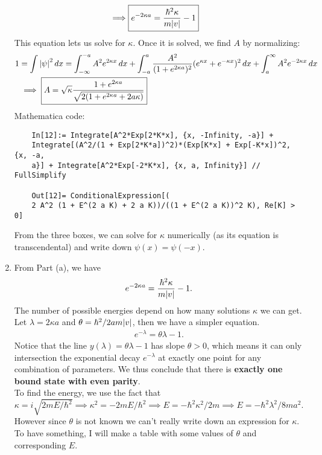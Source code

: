\documentclass{article}
\theoremstyle{definition}
\newcommand{\f}[2]{\frac{#1}{#2}}
\begin{document}
\begin{enumerate}[label=(\alph*)]
\begin{align*}
	\implies & \boxed{e^{-2\kappa a} = \f{\hbar^2\kappa}{m\abs{v}}-1}
	\end{align*}
	This equation lets us solve for $\kappa$. Once it is solved, we find $A$ by normalizing:
	\begin{align*}
	1 &= \int \abs{\psi}^2\,dx =  \int_{-\infty}^{-a} A^2 e^{2\kappa x} \,dx + \int_{-a}^{a} \f{A^2}{(1+e^{2\kappa a})^2} (e^{\kappa x} + e^{-\kappa x})^2 \,dx + \int_{a}^{\infty} A^2 e^{-2\kappa x} \,dx \\
	 &\implies  \boxed{{A} =  \sqrt{\kappa} \f{1+e^{2\kappa a}}{\sqrt{2(1 + e^{2\kappa a} + 2a\kappa)}}}
	\end{align*} 
	Mathematica code:
	\begin{lstlisting}
	In[12]:= Integrate[A^2*Exp[2*K*x], {x, -Infinity, -a}] + 
	Integrate[(A^2/(1 + Exp[2*K*a])^2)*(Exp[K*x] + Exp[-K*x])^2, {x, -a,
	a}] + Integrate[A^2*Exp[-2*K*x], {x, a, Infinity}] // FullSimplify
	
	Out[12]= ConditionalExpression[(
	2 A^2 (1 + E^(2 a K) + 2 a K))/((1 + E^(2 a K))^2 K), Re[K] > 0]
	\end{lstlisting}
	From the three boxes, we can solve for $\kappa$ numerically (as its equation is transcendental) and write down $\psi(x) = \psi(-x)$. 
	
	\item From Part (a), we have
	\begin{align*}
	e^{-2\kappa a} = \f{\hbar^2\kappa}{m\abs{v}}-1. 
	\end{align*}
	The number of possible energies depend on how many solutions $\kappa$ we can get. Let $\lambda = 2\kappa a$ and $\theta = \hbar^2 /2am\abs{v}$, then we have a simpler equation.
	\begin{align*}
	e^{-\lambda } = \theta \lambda - 1. 
	\end{align*}
	Notice that the line $y(\lambda) = \theta\lambda - 1$ has slope $\theta > 0$, which means it can only intersection the exponential decay $e^{-\lambda}$ at exactly one point for any combination of parameters. We thus conclude that there is \textbf{exactly one bound state with even parity}.\\
	
	To find the energy, we use the fact that $\kappa = i\sqrt{2mE/\hbar^2} \implies \kappa^2 = -2mE/\hbar^2 \implies {E = -\hbar^2\kappa^2/2m} \implies E = -\hbar^2\lambda^2/8ma^2$. However since $\theta$ is not known we can't really write down an expression for $\kappa$. To have something, I will make a table with some values of $\theta$ and corresponding $E$. 
	

\end{enumerate}
\end{document}

